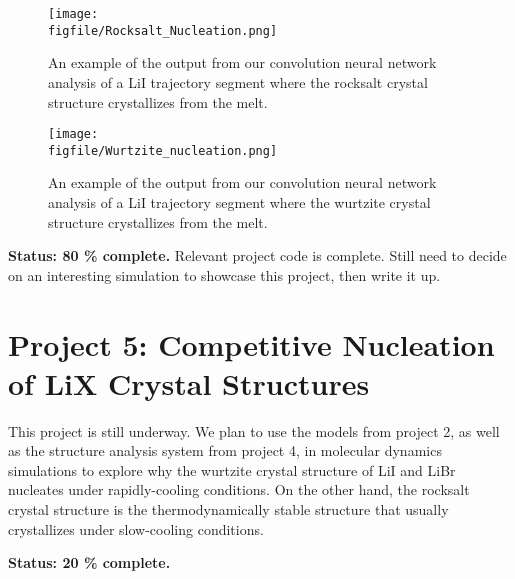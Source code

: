 \documentclass[titlepage,11pt]{article}
\newcommand{\figfile}{./figures}
\begin{document}
\begin{figure}
	\texttt{[image: \\figfile/Rocksalt\_Nucleation.png]}
	\caption{\label{fig:RS_Nuc} An example of the output from our convolution neural network analysis of a LiI trajectory segment where the rocksalt crystal structure crystallizes from the melt.}
\end{figure}

\begin{figure}
	\texttt{[image: \\figfile/Wurtzite\_nucleation.png]}
	\caption{\label{fig:WZ_Nuc} An example of the output from our convolution neural network analysis of a LiI trajectory segment where the wurtzite crystal structure crystallizes from the melt.}
\end{figure}


\textbf{Status: 80 \% complete.} Relevant project code is complete. Still need to decide on an interesting simulation to showcase this project, then write it up.


\section{Project 5: Competitive Nucleation of LiX Crystal Structures}

This project is still underway. We plan to use the models from project 2, as well as the structure analysis system from project 4, in molecular dynamics simulations to explore why the wurtzite crystal structure of LiI and LiBr nucleates under rapidly-cooling conditions. On the other hand, the rocksalt crystal structure is the thermodynamically stable structure that usually crystallizes under slow-cooling conditions.~\cite{liebold2008experimental,vcanvcarevic2005theoretical}

\textbf{Status: 20 \% complete.} 



\singlespacing
\setlength{\bibsep}{0pt plus 0.0ex}


\end{document}
